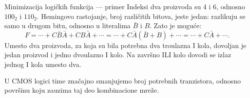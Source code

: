 \begin{frame}[label=02-s032b]{Minimizacija logičkih funkcija — primer}
\setlength{\abovedisplayskip}{4pt}\setlength{\abovedisplayshortskip}{4pt}
\setlength{\belowdisplayskip}{4pt}\setlength{\belowdisplayshortskip}{4pt}
Indeksi dva proizvoda su 4 i 6, odnosno \(100_2\) i \(110_2\). Hemingovo rastojanje, broj različitih bitova, jeste jedan: razlikuju se samo u drugom bitu, odnosno u literalima \(\bar B\) i \(B\). Zato je moguće:
\[F=\cdots+C\bar B\bar A+CB\bar A+\cdots
 =\cdots+C\bar A(\bar B+B)+\cdots
 =\cdots+C\bar A+\cdots.\]
Umesto dva proizvoda, za koja su bila potrebna dva troulazna I kola, dovoljan je jedan proizvod i jedno dvoulazno I kolo. Na završno ILI kolo dovodi se izlaz jednog I kola umesto dva.
\par\vspace{3mm}
\par\vspace{3mm}
U CMOS logici time \alert{značajno smanjujemo broj potrebnih tranzistora, odnosno površinu} koju zauzima taj deo kombinacione mreže.
\end{frame}
